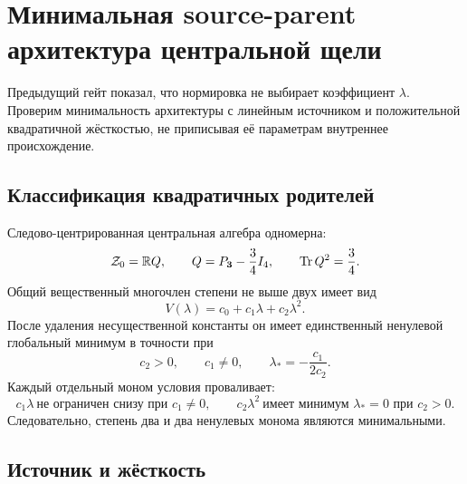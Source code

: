 \chapter{Минимальная source-parent архитектура центральной щели}
\label{ch:v8-baryon-c0-singlet-triplet-central-gap-minimal-source-parent-architecture-gate}

Предыдущий гейт показал, что нормировка не выбирает коэффициент
$\lambda$. Проверим минимальность архитектуры с линейным источником и
положительной квадратичной жёсткостью, не приписывая её параметрам
внутреннее происхождение.

\section{Классификация квадратичных родителей}

Следово-центрированная центральная алгебра одномерна:
\begin{equation}
 \mathcal Z_0=\mathbb R Q,
 \qquad Q=P_{\mathbf3}-\frac34I_4,
 \qquad \operatorname{Tr} Q^2=\frac34.
 \label{eq:v8-baryon-c0-central-gap-source-central-line}
\end{equation}
Общий вещественный многочлен степени не выше двух имеет вид
\begin{equation}
 V(\lambda)=c_0+c_1\lambda+c_2\lambda^2.
 \label{eq:v8-baryon-c0-central-gap-general-quadratic-parent}
\end{equation}
После удаления несущественной константы он имеет единственный ненулевой
глобальный минимум в точности при
\begin{equation}
 c_2>0,
 \qquad c_1\ne0,
 \qquad \lambda_*=-\frac{c_1}{2c_2}.
 \label{eq:v8-baryon-c0-central-gap-quadratic-classification}
\end{equation}
Каждый отдельный моном условия проваливает:
\begin{equation}
 c_1\lambda\ \text{не ограничен снизу при }c_1\ne0,
 \qquad
 c_2\lambda^2\ \text{имеет минимум }\lambda_*=0\text{ при }c_2>0.
 \label{eq:v8-baryon-c0-central-gap-single-monomial-failures}
\end{equation}
Следовательно, степень два и два ненулевых монома являются минимальными.

\section{Источник и жёсткость}

